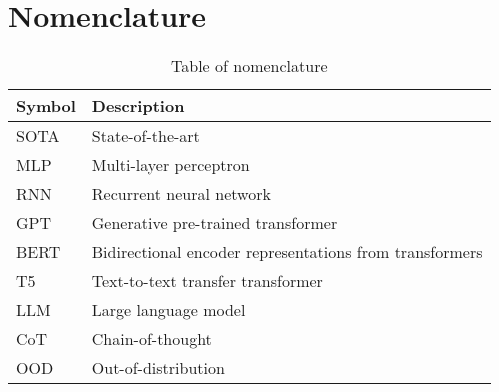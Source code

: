 \chapter{Nomenclature}\label{app:nomenclature}

\begin{table}[H]
    \centering
    \begin{tabular}{ll}
        \toprule
        \textbf{Symbol} & \textbf{Description}                                    \\
        \midrule
        SOTA            & State-of-the-art                                        \\
        MLP             & Multi-layer perceptron                                  \\
        RNN             & Recurrent neural network                                \\
        GPT             & Generative pre-trained transformer                      \\
        BERT            & Bidirectional encoder representations from transformers \\
        T5              & Text-to-text transfer transformer                       \\
        LLM             & Large language model                                    \\
        CoT             & Chain-of-thought                                        \\
        OOD             & Out-of-distribution                                     \\
        \bottomrule
    \end{tabular}
    \caption{Table of nomenclature}
    \label{tab:nomenclature}
\end{table}